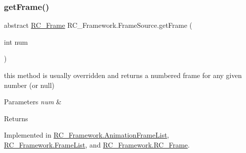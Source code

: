 \mbox{\label{class_r_c___framework_1_1_frame_source_a562dc295b5c265ec760227978802eb3a}} 
\subsubsection{\texorpdfstring{get\+Frame()}{getFrame()}\hspace{0.1cm}{\footnotesize\ttfamily [2/2]}}
{\footnotesize\ttfamily abstract \mbox{\hyperlink{class_r_c___framework_1_1_r_c___frame}{R\+C\+\_\+\+Frame}} R\+C\+\_\+\+Framework.\+Frame\+Source.\+get\+Frame (\begin{DoxyParamCaption}\item[{int}]{num }\end{DoxyParamCaption})\hspace{0.3cm}{\ttfamily [pure virtual]}}



this method is usually overridden and returns a numbered frame for any given number (or null) 


\begin{DoxyParams}{Parameters}
{\em num} & \\
\hline
\end{DoxyParams}
\begin{DoxyReturn}{Returns}

\end{DoxyReturn}


Implemented in \mbox{\hyperlink{class_r_c___framework_1_1_animation_frame_list_aa253565464d98bf955c81702fd3d66a4}{R\+C\+\_\+\+Framework.\+Animation\+Frame\+List}}, \mbox{\hyperlink{class_r_c___framework_1_1_frame_list_a5bfd1878eccd7e9e0c66f6e848383e6b}{R\+C\+\_\+\+Framework.\+Frame\+List}}, and \mbox{\hyperlink{class_r_c___framework_1_1_r_c___frame_ad0a2ae1e80157a79713552d9484eb5de}{R\+C\+\_\+\+Framework.\+R\+C\+\_\+\+Frame}}.

\mbox{\label{class_r_c___framework_1_1_frame_source_a4ab94513c0555c16316b540aed1e9144}} 
